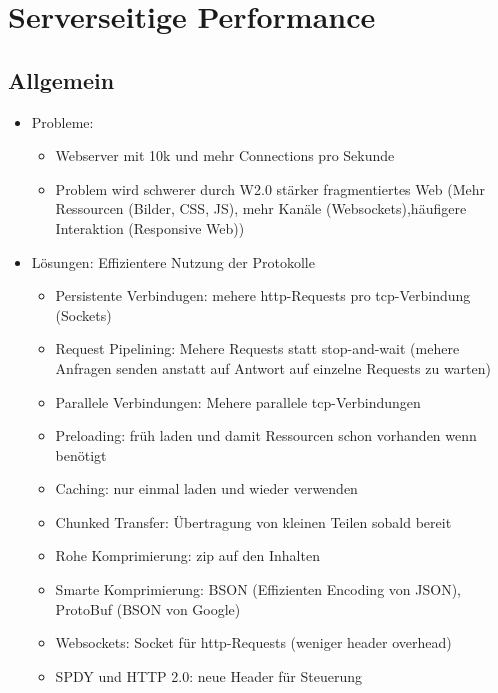 \documentclass{article} %
\begin{document}
\section{Serverseitige Performance}
	\subsection{Allgemein}
	\begin{itemize}
		\item Probleme:
		\begin{itemize}
			\item Webserver mit 10k und mehr Connections pro Sekunde
			\item Problem wird schwerer durch W2.0 stärker fragmentiertes Web (Mehr Ressourcen (Bilder, CSS, JS), mehr Kanäle (Websockets),häufigere Interaktion (Responsive Web))
		\end{itemize}
		\item Lösungen: Effizientere Nutzung der Protokolle
		\begin{itemize}
			\item Persistente Verbindugen: mehere http-Requests pro tcp-Verbindung (Sockets)
			\item Request Pipelining: Mehere Requests statt stop-and-wait (mehere Anfragen senden anstatt auf Antwort auf einzelne Requests zu warten)
			\item Parallele Verbindungen: Mehere parallele tcp-Verbindungen
			\item Preloading: früh laden und damit Ressourcen schon vorhanden wenn benötigt
			\item Caching: nur einmal laden und wieder verwenden
			\item Chunked Transfer: Übertragung von kleinen Teilen sobald bereit
			\item Rohe Komprimierung: zip auf den Inhalten
			\item Smarte Komprimierung: BSON (Effizienten Encoding von JSON), ProtoBuf (BSON von Google)
			\item Websockets: Socket für http-Requests (weniger header overhead)
			\item SPDY und HTTP 2.0: neue Header für Steuerung
		\end{itemize}
	\end{itemize}
\end{document}
